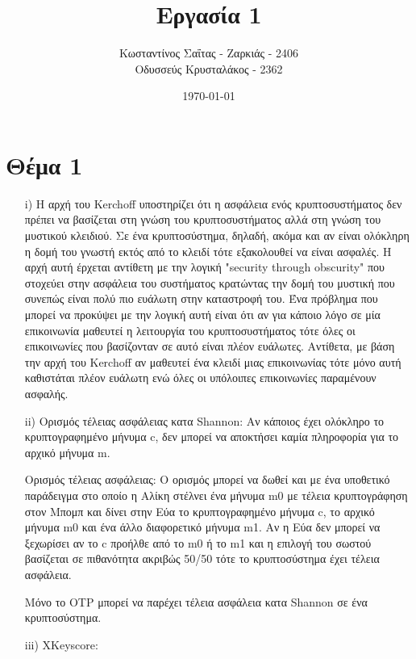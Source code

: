 \documentclass[a4paper, 11pt]{article}
\title{Εργασία 1}
\author{Κωσταντίνος Σαΐτας - Ζαρκιάς - 2406 \\ Οδυσσεύς Κρυσταλάκος - 2362}
\date{\today}
\newcommand{\lt}{\latintext}
\begin{document}
\maketitle

\section*{Θέμα 1}


\begin{itemize}
	\item[{\lt i)}] Η αρχή του {\lt Kerchoff} υποστηρίζει ότι η ασφάλεια ενός κρυπτοσυστήματος δεν πρέπει να βασίζεται στη γνώση του κρυπτοσυστήματος αλλά στη γνώση του μυστικού κλειδιού. Σε ένα κρυπτοσύστημα, δηλαδή, ακόμα και αν είναι ολόκληρη η δομή του γνωστή εκτός από το κλειδί τότε εξακολουθεί να είναι ασφαλές. Η αρχή αυτή έρχεται αντίθετη με την λογική "{\lt security through obscurity}" που στοχεύει στην ασφάλεια του συστήματος κρατώντας την δομή του μυστική που συνεπώς είναι πολύ πιο ευάλωτη στην καταστροφή του. Ένα πρόβλημα που μπορεί να προκύψει με την λογική αυτή είναι ότι αν για κάποιο λόγο σε μία επικοινωνία μαθευτεί η λειτουργία του κρυπτοσυστήματος τότε όλες οι επικοινωνίες που βασίζονταν σε αυτό είναι πλέον ευάλωτες. Αντίθετα, με βάση την αρχή του {\lt Kerchoff} αν μαθευτεί ένα κλειδί μιας επικοινωνίας τότε μόνο αυτή καθιστάται πλέον ευάλωτη ενώ όλες οι υπόλοιπες επικοινωνίες παραμένουν ασφαλής. 
		
	
	
	\item[{\lt ii)}] Ορισμός τέλειας ασφάλειας κατα {\lt Shannon}: Αν κάποιος έχει ολόκληρο το κρυπτογραφημένο μήνυμα {\lt c}, δεν μπορεί να αποκτήσει καμία πληροφορία για το αρχικό μήνυμα {\lt m}.
	
					Ορισμός τέλειας ασφάλειας: Ο ορισμός μπορεί να δωθεί και με ένα υποθετικό παράδειγμα στο οποίο η Αλίκη στέλνει ένα μήνυμα {\lt m0} με τέλεια κρυπτογράφηση στον Μπομπ και δίνει στην Εύα το κρυπτογραφημένο μήνυμα {\lt c}, το αρχικό μήνυμα {\lt m0} και ένα άλλο διαφορετικό μήνυμα {\lt m1}. Αν η Εύα δεν μπορεί να ξεχωρίσει αν το {\lt c} προήλθε από το {\lt m0} ή το {\lt m1} και η επιλογή του σωστού βασίζεται σε πιθανότητα ακριβώς 50/50 τότε το κρυπτοσύστημα έχει τέλεια ασφάλεια.
	
	Μόνο το {\lt OTP} μπορεί να παρέχει τέλεια ασφάλεια κατα {\lt Shannon} σε ένα κρυπτοσύστημα.
	
	\newpage	
	
	\item[{\lt iii)}] {\lt XKeyscore}:  
	

\end{itemize}
\end{document}

